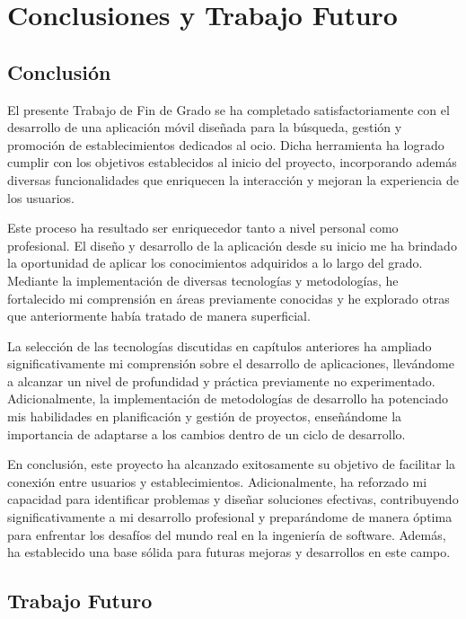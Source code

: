 \chapter{Conclusiones y Trabajo Futuro}

\section{Conclusión}

El presente Trabajo de Fin de Grado se ha completado satisfactoriamente con el desarrollo de una aplicación móvil diseñada para la búsqueda, gestión y promoción de establecimientos dedicados al ocio. Dicha herramienta ha logrado cumplir con los objetivos establecidos al inicio del proyecto, incorporando además diversas funcionalidades que enriquecen la interacción y mejoran la experiencia de los usuarios.

Este proceso ha resultado ser enriquecedor tanto a nivel personal como profesional. El diseño y desarrollo de la aplicación desde su inicio me ha brindado la oportunidad de aplicar los conocimientos adquiridos a lo largo del grado. Mediante la implementación de diversas tecnologías y metodologías, he fortalecido mi comprensión en áreas previamente conocidas y he explorado otras que anteriormente había tratado de manera superficial.

La selección de las tecnologías discutidas en capítulos anteriores ha ampliado significativamente mi comprensión sobre el desarrollo de aplicaciones, llevándome a alcanzar un nivel de profundidad y práctica previamente no experimentado. Adicionalmente, la implementación de metodologías de desarrollo ha potenciado mis habilidades en planificación y gestión de proyectos, enseñándome la importancia de adaptarse a los cambios dentro de un ciclo de desarrollo.

En conclusión, este proyecto ha alcanzado exitosamente su objetivo de facilitar la conexión entre usuarios y establecimientos. Adicionalmente, ha reforzado mi capacidad para identificar problemas y diseñar soluciones efectivas, contribuyendo significativamente a mi desarrollo profesional y preparándome de manera óptima para enfrentar los desafíos del mundo real en la ingeniería de software. Además, ha establecido una base sólida para futuras mejoras y desarrollos en este campo.

\section{Trabajo Futuro}

